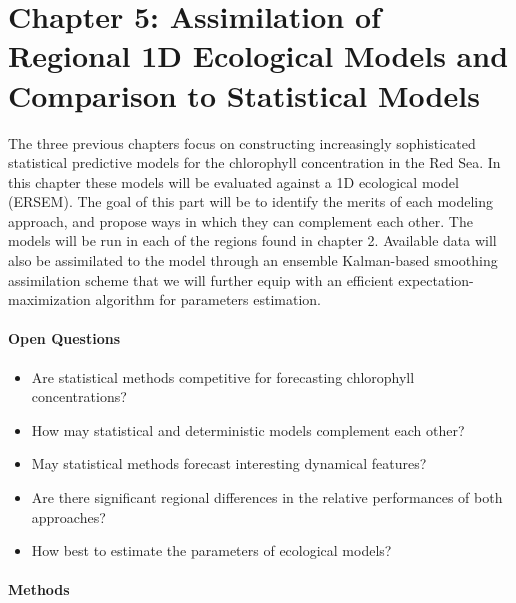 \section{Chapter 5: Assimilation of Regional 1D Ecological Models and
Comparison to Statistical Models}

The three previous chapters focus on constructing increasingly sophisticated
statistical predictive models for the chlorophyll concentration in the Red Sea.
In this chapter these models will be evaluated against a 1D ecological model
(ERSEM). The goal of this part will be to identify the merits of each modeling
approach, and propose ways in which they can complement each other.  The models
will be run in each of the regions found in chapter 2.  Available data will
also be assimilated to the model through an ensemble Kalman-based smoothing
assimilation scheme that we will further equip with an efficient
expectation-maximization algorithm for parameters estimation.

\paragraph{Open Questions}

\begin{itemize}

\item Are statistical methods competitive for forecasting chlorophyll
concentrations?

\item How may statistical and deterministic models complement each other?

\item May statistical methods forecast interesting dynamical features?

\item Are there significant regional differences in the relative performances
of both approaches?

\item How best to estimate the parameters of ecological models? 

\end{itemize}

\paragraph{Methods}

